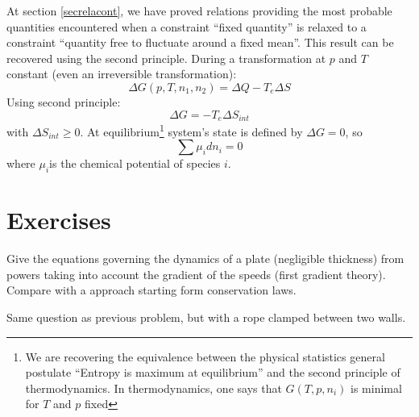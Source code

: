 \documentclass[12pt]{book}
\begin{document}
\begin{exmp}
At section \ref{secrelacont}, we have proved relations providing the most
probable quantities encountered when a constraint ``fixed quantity'' is relaxed
to a constraint ``quantity free to fluctuate around a fixed mean''. This
result can be recovered using the second principle. During a transformation at
$p$ and $T$ constant (even an irreversible transformation):
\begin{equation}
\Delta G(p,T,n_1,n_2)=\Delta Q -T_e\Delta S
\end{equation}
Using second principle:
\begin{equation}
\Delta G=-T_e\Delta S_{int}
\end{equation}
with $\Delta S_{int}\geq 0$. At equilibrium\footnote{%
We are recovering the equivalence between the physical statistics general
postulate ``Entropy is maximum at equilibrium'' and the second principle of
thermodynamics. In thermodynamics, one says that $G(T,p,n_i)$ is minimal for
$T$ and $p$ fixed}%
system's state is defined by $\Delta G=0$, so
\begin{equation}
\sum\mu_i dn_i=0
\end{equation}
where $\mu_i$is the chemical potential of species $i$. 
\end{exmp}


\section{Exercises}
\begin{exo}
Give the equations governing the dynamics of a plate (negligible thickness)
from powers taking into account the gradient of the speeds (first gradient
theory). Compare with a approach starting form conservation laws.
\end{exo}

\begin{exo}
Same question as previous problem, but with a rope clamped between two walls. 
\end{exo}
\end{document}
